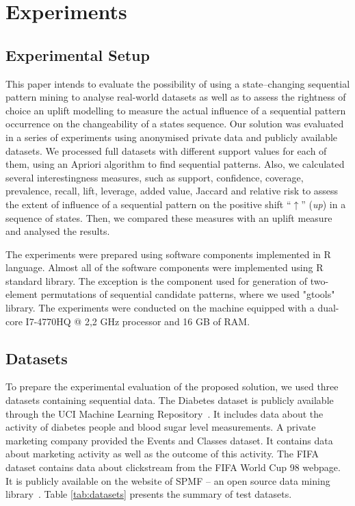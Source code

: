 \documentclass[runningheads,a4paper]{llncs}
\begin{document}
\section{Experiments}
\label{sec:experiments}
\subsection{Experimental Setup}
This paper intends to evaluate the possibility of using a state--changing sequential pattern mining to analyse real-world datasets as well as to assess the rightness of choice an uplift modelling to measure the actual influence of a sequential pattern occurrence on the changeability of a states sequence. Our solution was evaluated in a series of experiments using anonymised private data and publicly available datasets. We processed full datasets with different support values for each of them, using an Apriori algorithm to find sequential patterns. Also, we calculated several interestingness measures, such as support, confidence, coverage, prevalence, recall, lift, leverage, added value, Jaccard and relative risk to assess the extent of influence of a sequential pattern on the positive shift ``$\uparrow$'' (\textit{up}) in a sequence of states. Then, we compared these measures with an uplift measure and analysed the results. 

The experiments were prepared using software components implemented in R language. Almost all of the software components were implemented using R standard library. The exception is the component used for generation of two-element permutations of sequential candidate patterns, where we used "gtools" library. The experiments were conducted on the machine equipped with a dual-core I7-4770HQ @ 2,2 GHz processor and 16 GB of RAM.

\subsection{Datasets}
To prepare the experimental evaluation of the proposed solution, we used three datasets containing sequential data. The Diabetes dataset is publicly available through the UCI Machine Learning Repository~\cite{Kahn:1994}. It includes data about the activity of diabetes people and blood sugar level measurements. A private marketing company provided the Events and Classes dataset. It contains data about marketing activity as well as the outcome of this activity. The FIFA dataset contains data about clickstream from the FIFA World Cup 98 webpage. It is publicly available on the website of SPMF – an open source data mining library~\cite{Fournier}. Table \ref{tab:datasets} presents the summary of test datasets.
\end{document}
